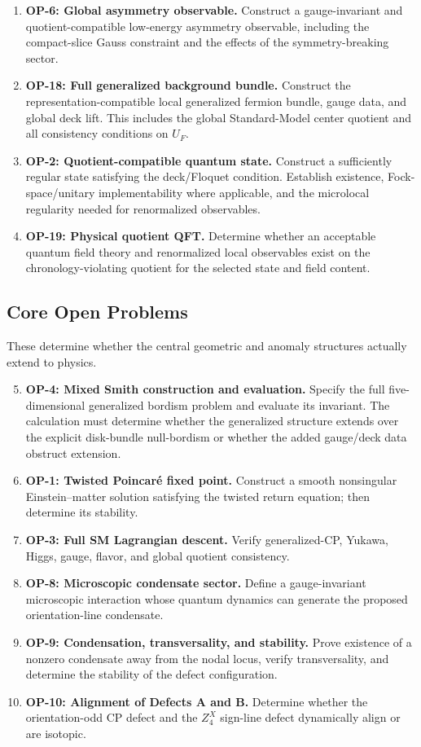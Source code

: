 \documentclass[11pt]{article}
\theoremstyle{canonmath}
\theoremstyle{canonpostulate}
\theoremstyle{canonclaim}
\def\mathbb#1{#1}%
\begin{document}
\begin{enumerate}
\item \textbf{OP-6: Global asymmetry observable.} Construct a gauge-invariant and quotient-compatible low-energy asymmetry observable, including the compact-slice Gauss constraint and the effects of the symmetry-breaking sector.
\item \textbf{OP-18: Full generalized background bundle.} Construct the representation-compatible local generalized fermion bundle, gauge data, and global deck lift. This includes the global Standard-Model center quotient and all consistency conditions on $U_F$.
\item \textbf{OP-2: Quotient-compatible quantum state.} Construct a sufficiently regular state satisfying the deck/Floquet condition. Establish existence, Fock-space/unitary implementability where applicable, and the microlocal regularity needed for renormalized observables.
\item \textbf{OP-19: Physical quotient QFT.} Determine whether an acceptable quantum field theory and renormalized local observables exist on the chronology-violating quotient for the selected state and field content.
\end{enumerate}

\subsection*{Core Open Problems}
These determine whether the central geometric and anomaly structures actually extend to physics.

\begin{enumerate}
\setcounter{enumi}{4}
\item \textbf{OP-4: Mixed Smith construction and evaluation.} Specify the full five-dimensional generalized bordism problem and evaluate its invariant. The calculation must determine whether the generalized structure extends over the explicit disk-bundle null-bordism or whether the added gauge/deck data obstruct extension.
\item \textbf{OP-1: Twisted Poincar\'e fixed point.} Construct a smooth nonsingular Einstein--matter solution satisfying the twisted return equation; then determine its stability.
\item \textbf{OP-3: Full SM Lagrangian descent.} Verify generalized-CP, Yukawa, Higgs, gauge, flavor, and global quotient consistency.
\item \textbf{OP-8: Microscopic condensate sector.} Define a gauge-invariant microscopic interaction whose quantum dynamics can generate the proposed orientation-line condensate.
\item \textbf{OP-9: Condensation, transversality, and stability.} Prove existence of a nonzero condensate away from the nodal locus, verify transversality, and determine the stability of the defect configuration.
\item \textbf{OP-10: Alignment of Defects A and B.} Determine whether the orientation-odd CP defect and the $\mathbb Z_4^X$ sign-line defect dynamically align or are isotopic.
\end{enumerate}
\end{document}
